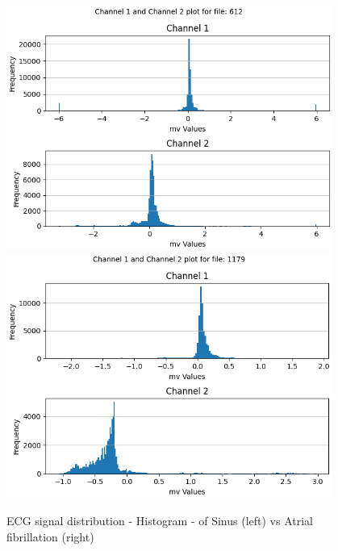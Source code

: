 \begin{figure}[ht!]
\begin{minipage}{.5\textwidth}
      \centering
        \includegraphics[width=1.0\linewidth, height=8cm]{BachelorMasterThesis/DataExploration/Figures/atrial_fibrillation/histogram/612.png}
            \label{fig:af_histogram_1}
        \includegraphics[width=1.0\linewidth, height=8cm]{BachelorMasterThesis/DataExploration/Figures/atrial_fibrillation/histogram/1179.png}
            \label{fig:af_histogram_2}
    \end{minipage}
    \caption{ECG signal distribution - Histogram - of Sinus (left) vs Atrial fibrillation (right)}
    \label{fig:ecg_histogram_plot_1_sinus_vs_af}
\end{figure}

